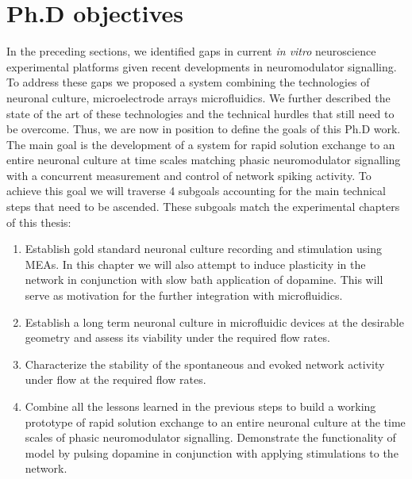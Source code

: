     \section{Ph.D objectives}
    In the preceding sections, we identified gaps in current \textit{in vitro} neuroscience experimental platforms given recent developments in neuromodulator signalling. To address these gaps we proposed a system combining the technologies of neuronal culture, microelectrode arrays microfluidics. We further described the state of the art of these technologies and the technical hurdles that still need to be overcome. Thus, we are now in position to define the goals of this Ph.D work. The main goal is the development of a system for rapid solution exchange to an entire neuronal culture at time scales matching phasic neuromodulator signalling with a concurrent measurement and control of network spiking activity. To achieve this goal we will traverse 4 subgoals accounting for the main technical steps that need to be ascended. These subgoals match the experimental chapters of this thesis:

    \begin{enumerate}
    \item Establish gold standard neuronal culture recording and stimulation using MEAs. In this chapter we will also attempt to induce plasticity in the network in conjunction with slow bath application of dopamine. This will serve as motivation for the further integration with microfluidics.

    \item Establish a long term neuronal culture in microfluidic devices at the desirable geometry and assess its viability under the required flow rates.

    \item Characterize the stability of the spontaneous and evoked network activity under flow at the required flow rates.

    \item Combine all the lessons learned in the previous steps to build a working prototype of rapid solution exchange to an entire neuronal culture at the time scales of phasic neuromodulator signalling. Demonstrate the functionality of model by pulsing dopamine in conjunction with applying stimulations to the network. 
    \end{enumerate}


    \label{sec:introduction:objs}

